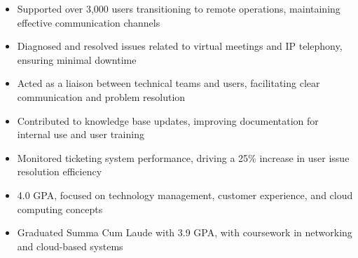 \par\smallskip
\noindent
\begin{minipage}{20cm}
  \begin{minipage}{9.75cm}
    \begin{itemize}
      \item Supported over 3,000 users transitioning to remote operations, maintaining effective communication channels
      \item Diagnosed and resolved issues related to virtual meetings and IP telephony, ensuring minimal downtime
      \item Acted as a liaison between technical teams and users, facilitating clear communication and problem resolution
    \end{itemize}
  \end{minipage}
  \hfill
  \begin{minipage}{9.75cm}
    \begin{itemize}
      \item Contributed to knowledge base updates, improving documentation for internal use and user training
      \item Monitored ticketing system performance, driving a 25\% increase in user issue resolution efficiency
    \end{itemize}
  \end{minipage}
\end{minipage}

\begin{itemize}
  \item 4.0 GPA, focused on technology management, customer experience, and cloud computing concepts
\end{itemize}
\divider

\begin{itemize}
  \item Graduated Summa Cum Laude with 3.9 GPA, with coursework in networking and cloud-based systems
\end{itemize}

\noindent
\begin{minipage}{20cm}
\end{minipage}


